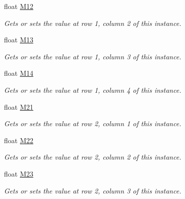 \begin{DoxyCompactItemize}
float \hyperlink{struct_open_t_k_1_1_matrix3x4_aa407505147c8711c5602112d0b3afa7b}{M12}
\begin{DoxyCompactList}\small\item\em Gets or sets the value at row 1, column 2 of this instance. \end{DoxyCompactList}\item 
float \hyperlink{struct_open_t_k_1_1_matrix3x4_af186eaaca4f85a6d8aeb7cd040005352}{M13}
\begin{DoxyCompactList}\small\item\em Gets or sets the value at row 1, column 3 of this instance. \end{DoxyCompactList}\item 
float \hyperlink{struct_open_t_k_1_1_matrix3x4_a85305bf70db9481d023cdf0b8eb26482}{M14}
\begin{DoxyCompactList}\small\item\em Gets or sets the value at row 1, column 4 of this instance. \end{DoxyCompactList}\item 
float \hyperlink{struct_open_t_k_1_1_matrix3x4_a2a6b4e1fe73a29d0de429d389322391b}{M21}
\begin{DoxyCompactList}\small\item\em Gets or sets the value at row 2, column 1 of this instance. \end{DoxyCompactList}\item 
float \hyperlink{struct_open_t_k_1_1_matrix3x4_aedf2aae9f2d2a4e87c734fa78b69a6a7}{M22}
\begin{DoxyCompactList}\small\item\em Gets or sets the value at row 2, column 2 of this instance. \end{DoxyCompactList}\item 
float \hyperlink{struct_open_t_k_1_1_matrix3x4_a02b0048a8c53fc9e502587337c8b4ab7}{M23}
\begin{DoxyCompactList}\small\item\em Gets or sets the value at row 2, column 3 of this instance. \end{DoxyCompactList}\item 

\end{DoxyCompactItemize}
